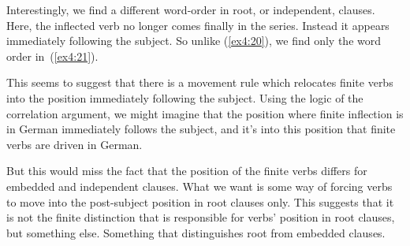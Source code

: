 Interestingly, we find a different word-order in root, or independent, clauses. Here, the inflected verb no longer comes finally in the series. Instead it appears immediately following the subject. So unlike (\ref{ex4:20}), we find only the word order in~(\ref{ex4:21}).
\begin{exe}
	\ex \label{ex4:21} 
	\begin{xlist}
	\end{xlist}
\end{exe}
This seems to suggest that there is a movement rule which relocates finite verbs into the position immediately following the subject. Using the logic of the correlation argument, we might imagine that the position where finite inflection is in German immediately follows the subject, and it's into this position that finite verbs are driven in German.

But this would miss the fact that the position of the finite verbs differs for embedded and independent clauses. What we want is some way of forcing verbs to move into the post-subject position in root clauses only. This suggests that it is not the finite distinction that is responsible for verbs' position in root clauses, but something else. Something that distinguishes root from embedded clauses.


